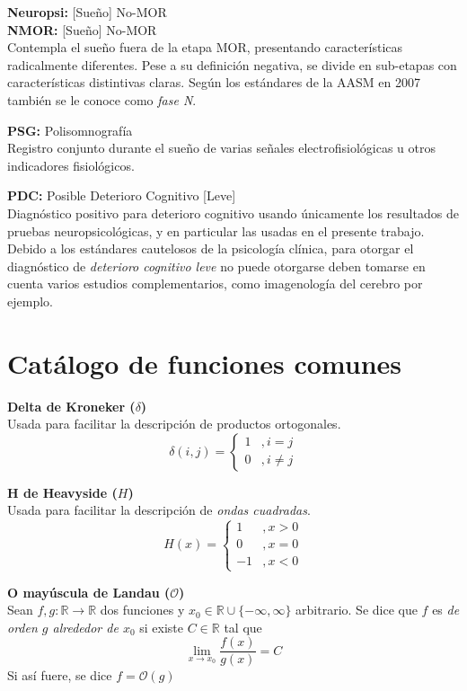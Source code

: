 \documentclass[12pt,letterpaper]{book}
\newcommand{\R}{\mathbb{R}}
\newcommand{\orden}[1]{\mathcal{O}\left( #1 \right)}
\begin{document}
{\textbf{Neuropsi:} [Sueño] No-MOR \\

\textbf{NMOR:} [Sueño] No-MOR \\
Contempla el sueño fuera de la etapa MOR, presentando características radicalmente diferentes.
Pese a su definición negativa, se divide en sub-etapas con características distintivas claras.
Según los estándares de la AASM en 2007 también se le conoce como \textit{fase N}.

\textbf{PSG:}  Polisomnografía \\
Registro conjunto durante el sueño de varias señales electrofisiológicas u otros indicadores fisiológicos.

\textbf{PDC:}  Posible Deterioro Cognitivo [Leve] \\
Diagnóstico positivo para deterioro cognitivo usando únicamente los resultados de pruebas neuropsicológicas, y en particular las usadas en el presente trabajo.
Debido a los estándares cautelosos de la psicología clínica, para otorgar el diagnóstico de \textit{deterioro cognitivo leve} no puede otorgarse deben tomarse en cuenta varios estudios complementarios, como imagenología del cerebro por ejemplo.

}

\section*{Catálogo de funciones comunes}
{
\setlength{\leftskip}{2em}
\setlength{\parindent}{-2em}

\textbf{Delta de Kroneker ($\delta$)} \\
Usada para facilitar la descripción de productos ortogonales.
\begin{equation*}
\delta(i,j) = \begin{cases}
1 &, i = j \\
0 &, i \neq j
\end{cases}
\end{equation*}

\textbf{H de Heavyside ($H$)} \\
Usada para facilitar la descripción de \textit{ondas cuadradas}.
\begin{equation*}
H(x) = \begin{cases}
1 &, x>0 \\
0 &, x=0 \\
-1 &, x<0
\end{cases}
\end{equation*}

\textbf{O mayúscula de Landau ($\mathcal{O}$)} \\
Sean $f, g : \R \rightarrow \R$ dos funciones y $x_0 \in \R \cup \{ -\infty, \infty\}$ arbitrario. Se dice que $f$ es \textit{de orden $g$ alrededor de $x_0$} si existe $C \in \R$ tal que
\begin{equation*}
\lim_{x \rightarrow x_0} \frac{f(x)}{g(x)} = C
\end{equation*} 
Si así fuere, se dice $f = \orden{g}$
}
\end{document}
